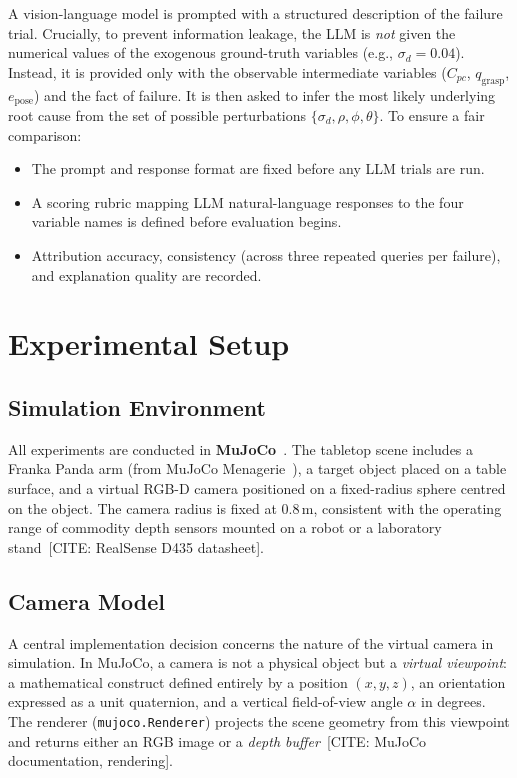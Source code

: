 \documentclass[journal]{IEEEtran}
\begin{document}
A vision-language model is prompted with a structured description
of the failure trial. Crucially, to prevent information leakage, the LLM
is \emph{not} given the numerical values of the exogenous ground-truth
variables (e.g., $\sigma_d = 0.04$). Instead, it is provided only with the
observable intermediate variables ($C_{pc}$, $q_{\text{grasp}}$, $e_{\text{pose}}$)
and the fact of failure. It is then asked to infer the most likely
underlying root cause from the set of possible perturbations $\{\sigma_d, \rho, \phi,
\theta\}$.  To ensure a fair comparison:
\begin{itemize}
  \item The prompt and response format are fixed before any LLM
        trials are run.
  \item A scoring rubric mapping LLM natural-language responses to
        the four variable names is defined before evaluation begins.
  \item Attribution accuracy, consistency (across three repeated
        queries per failure), and explanation quality are recorded.
\end{itemize}

\section{Experimental Setup}
\label{sec:experiments}

\subsection{Simulation Environment}

All experiments are conducted in \textbf{MuJoCo}~\cite{todorov2012mujoco}.
The tabletop scene includes a Franka Panda arm (from MuJoCo
Menagerie~\cite{menagerie2022}), a target object placed on a table surface,
and a virtual RGB-D camera positioned on a fixed-radius sphere centred on
the object.  The camera radius is fixed at 0.8\,m, consistent with the
operating range of commodity depth sensors mounted on a robot or a
laboratory stand~[CITE: RealSense D435 datasheet].

\subsection{Camera Model}
\label{sec:camera_model}

A central implementation decision concerns the nature of the virtual camera
in simulation.  In MuJoCo, a camera is not a physical object but a
\emph{virtual viewpoint}: a mathematical construct defined entirely by a
position $(x, y, z)$, an orientation expressed as a unit quaternion, and a
vertical field-of-view angle $\alpha$ in degrees.  The renderer
(\texttt{mujoco.Renderer}) projects the scene geometry from this viewpoint
and returns either an RGB image or a \emph{depth buffer}~[CITE: MuJoCo
documentation, rendering].
\end{document}

